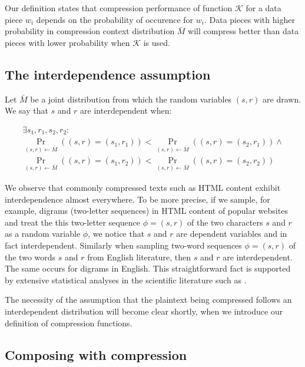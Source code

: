 \documentclass[conference, letterpaper, 10pt]{IEEEtran}
\begin{document}
Our definition states that compression performance of function $\mathcal{K}$ for
a data piece $w_i$ depends on the probability of occurence for $w_i$. Data
pieces with higher probability in compression context distribution $\bar{M}$
will compress better than data pieces with lower probability when $\mathcal{K}$
is used.

\subsection{The interdependence assumption}

Let $\bar{M}$ be a joint distribution from which the random variables $(s, r)$
are drawn. We say that $s$ and $r$ are interdependent when:

\begin{equation*}
\begin{split}
\exists s_1, r_1, s_2, r_2:\\
\Pr_{(s, r) \leftarrow \bar{M}}((s, r) = (s_1, r_1)) < \Pr_{(s, r) \leftarrow \bar{M}}((s, r) = (s_2, r_1))
\land\\
\Pr_{(s, r) \leftarrow \bar{M}}((s, r) = (s_1, r_2)) < \Pr_{(s, r) \leftarrow \bar{M}}((s, r) = (s_2, r_2))
\end{split}
\end{equation*}

We observe that commonly compressed texts such as HTML content exhibit
interdependence almost everywhere. To be more precise, if we sample, for
example, digrams (two-letter sequences) in HTML content of popular websites and
treat the this two-letter sequence $\phi = (s, r)$ of the two characters $s$ and
$r$ as a random variable $\phi$, we notice that $s$ and $r$ are dependent
variables and in fact interdependent. Similarly when sampling two-word sequences
$\phi = (s, r)$ of the two words $s$ and $r$ from English literature, then $s$
and $r$ are interdependent. The same occurs for digrams in English. This
straightforward fact is supported by extensive statistical analyses in the
scientific literature such as \cite{c18}.

The necessity of the assumption that the plaintext being compressed follows an
interdependent distribution will become clear shortly, when we introduce our
definition of compression functions.

\subsection{Composing with compression}\label{subsec:comcompose}
\end{document}
